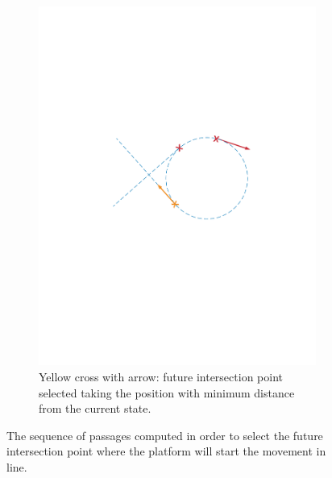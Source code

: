 \begin{itemize}
\begin{figure}[!htbp]
    \begin{subfigure}[b]{0.45\textwidth}
        \includegraphics[width=\textwidth]{img/intersection_5.pdf}
        \caption{Yellow cross with arrow: future intersection point selected taking the position with minimum distance from the current state. }
        \label{fig:five}
   \end{subfigure}
  \caption{The sequence of passages computed in order to select the future intersection point where the platform will start the movement in line.}
  \label{fig:sequence_find_next_intersection}
\end{figure} 

\end{itemize}


